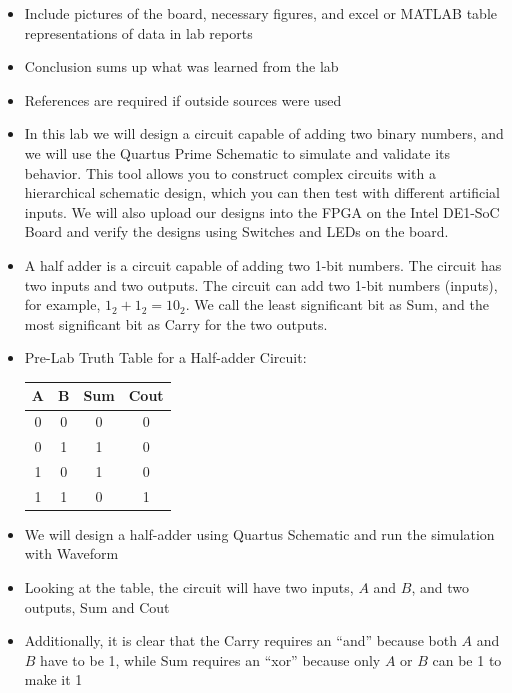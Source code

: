 \begin{itemize}
  \item Include pictures of the board, necessary figures, and excel or MATLAB table representations of data in lab reports

  \item Conclusion sums up what was learned from the lab

  \item References are required if outside sources were used

  \item In this lab we will design a circuit capable of adding two binary numbers, and we will use the Quartus Prime Schematic to simulate and validate its behavior. This tool allows you to construct complex circuits with a hierarchical schematic design, which you can then test with different artificial inputs. We will also upload our designs into the FPGA on the Intel DE1-SoC Board and verify the designs using Switches and LEDs on the board.

  \item A half adder is a circuit capable of adding two 1-bit numbers. The circuit has two inputs and two outputs. The circuit can add two 1-bit numbers (inputs), for example, $1_2+1_2 = 10_2$. We call the least significant bit as Sum, and the most significant bit as Carry for the two outputs. 

  \item Pre-Lab Truth Table for a Half-adder Circuit:

    \begin{center}
      \begin{tabular}[h]{c c | c c}
        \textbf{A} & \textbf{B} & \textbf{Sum} & \textbf{Cout}\\
        \hline
        0 & 0 & 0 & 0\\
        0 & 1 & 1 & 0\\
        1 & 0 & 1 & 0\\
        1 & 1 & 0 & 1
      \end{tabular}
    \end{center}

  \item We will design a half-adder using Quartus Schematic and run the simulation with Waveform 

  \item Looking at the table, the circuit will have two inputs, $A$ and $B$, and two outputs, Sum and Cout

  \item Additionally, it is clear that the Carry requires an ``and'' because both $A$ and $B$ have to be 1, while Sum requires an ``xor'' because only $A$ or $B$ can be 1 to make it 1


\end{itemize}
